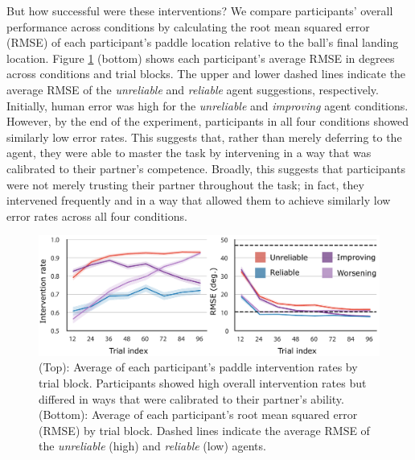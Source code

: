 \documentclass[10pt,letterpaper]{article}
\begin{document}
But how successful were these interventions? We compare participants' overall performance across conditions by calculating the root mean squared error (RMSE) of each participant's paddle location relative to the ball's final landing location. Figure \ref{fig:rmse} (bottom) shows each participant's average RMSE in degrees across conditions and trial blocks. The upper and lower dashed lines indicate the average RMSE of the \textit{unreliable} and \textit{reliable} agent suggestions, respectively. Initially, human error was high for the \textit{unreliable} and \textit{improving} agent conditions. However, by the end of the experiment, participants in all four conditions showed similarly low error rates. This suggests that, rather than merely deferring to the agent, they were able to master the task by intervening in a way that was calibrated to their partner's competence. Broadly, this suggests that participants were not merely trusting their partner throughout the task; in fact, they intervened frequently and in a way that allowed them to achieve similarly low error rates across all four conditions. 


\begin{figure}[t]
\begin{center}
\includegraphics[width=\linewidth]{img/rmse_intervention_rate_row.pdf}
\end{center}
\caption{(Top): Average of each participant's paddle intervention rates by trial block. Participants showed high overall intervention rates but differed in ways that were calibrated to their partner's ability. (Bottom): Average of each participant's root mean squared error (RMSE) by trial block. Dashed lines indicate the average RMSE of the \textit{unreliable} (high) and \textit{reliable} (low) agents.}
\label{fig:rmse}
\end{figure}
\end{document}
